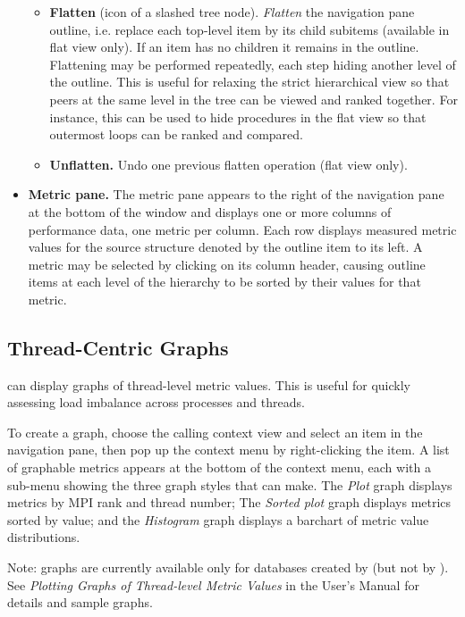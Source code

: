 \documentclass[english]{article}
\begin{document}
\begin{itemize}
\begin{itemize}
\item \textbf{Flatten} (icon of a slashed tree node).
\emph{Flatten} the navigation pane outline,
i.e. replace each top-level item by its child subitems
(available in flat view only).
If an item has no children it remains in the outline.
Flattening may be performed repeatedly, each step hiding another level of the outline.
This is useful for relaxing the strict hierarchical view
so that peers at the same level in the tree can be viewed and ranked together.
For instance, this can be used to hide procedures in the flat view
so that outermost loops can be ranked and compared.

\item \textbf{Unflatten.} Undo one previous flatten operation (flat view only).

\end{itemize}

\item  \textbf{Metric pane.}
The metric pane appears to the right of the navigation pane at the bottom of the window
and displays one or more columns of performance data, one metric per column.
Each row displays measured metric values for the source structure denoted by the outline item to its left.
A metric may be selected by clicking on its column header,
causing outline items at each level of the hierarchy to be sorted by their values for that metric.

\end{itemize}


\subsection{Thread-Centric Graphs}

 can display graphs of thread-level metric values.
This is useful for quickly assessing load imbalance across processes and threads.

To create a graph,
choose the calling context view and select an item in the navigation pane,
then pop up the context menu by right-clicking the item.
A list of graphable metrics appears at the bottom of the context menu,
each with a sub-menu showing the three graph styles that  can make.
The \emph{Plot} graph displays metrics by MPI rank and thread number;
The \emph{Sorted plot} graph displays metrics sorted by value;
and the \emph{Histogram} graph displays a barchart of metric value distributions.

Note: graphs are currently available only for databases created by 
(but not by ).
See \emph{Plotting Graphs of Thread-level Metric Values} in the User's Manual
for details and sample graphs.
\end{document}
